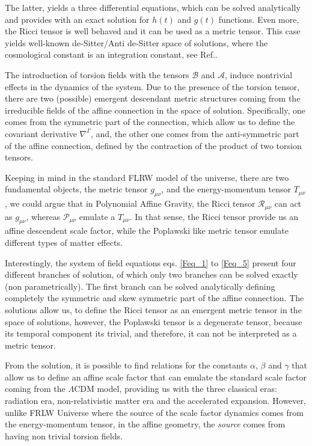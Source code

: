 The latter, yields a three differential equations, which can 
be solved analytically and provides with an exact solution for $h(t)$ and $g(t)$ functions. 
Even more, the Ricci tensor is well behaved and it can be used as a metric tensor. This case 
yields well-known de-Sitter/Anti de-Sitter space of solutions, where the cosmological constant is an
integration constant, see Ref.\cite{Castillo_Felisola_2020}.

The introduction of torsion fields with the tensors $\mathcal{B}$ and $\mathcal{A}$, induce 
nontrivial effects in the dynamics of the system. Due to the presence of the torsion tensor, 
there are two (possible) emergent descendant metric structures coming from the irreducible fields of the 
affine connection in the space of solution. Specifically, one comes from the symmetric part 
of the connection, which allow us to define the covariant derivative $\nabla^{\Gamma}$, and, 
the other one comes from  the anti-symmetric part of the affine connection, defined by the 
contraction of the product of two torsion tensors. 

Keeping in mind in the standard FLRW model of the universe, there are two fundamental objects, 
the metric tensor $g_{\mu\nu}$, and the energy-momentum tensor $T_{\mu\nu}$, we could argue
that in Polynomial Affine Gravity, the Ricci tensor $\mathcal{R}_{\mu\nu}$ can act as $g_{\mu\nu}$,
whereas $\mathcal{P}_{\mu\nu}$ emulate a $T_{\mu\nu}$. In that sense, the Ricci tensor provide us
an affine descendent scale factor, while the Poplawski like metric tensor emulate different types 
of matter effects.

Interestingly, the system of field equations eqs. \eqref{Feq_1} to \eqref{Feq_5} present four different 
branches of solution, of which only two branches can be solved exactly (non parametrically). The first
branch can be solved analytically defining completely the symmetric and skew symmetric part of the
affine connection. The solutions allow us, to define the Ricci tensor as an emergent metric
tensor in the space of solutions, however, the Poplawski tensor is a degenerate tensor, because its
temporal component its trivial, and therefore, it can not be interpreted as a metric tensor.

From the solution, it is possible to find relations for the constants $\alpha$, $\beta$ and $\gamma$
that allow us to define an affine scale factor that can emulate the standard scale factor coming
from the $\Lambda$CDM model, providing us with the three classical eras: radiation era, non-relativistic
matter era and the accelerated expansion. However, unlike FRLW Universe where the source of the scale
factor dynamics comes from the energy-momentum tensor, in the affine geometry, the \textit{source}
comes from  having non trivial torsion fields.

